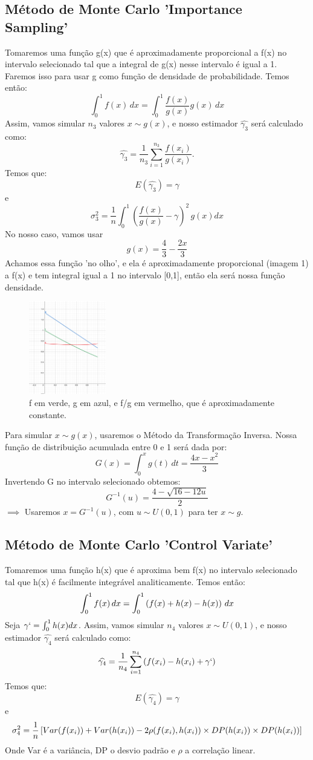 \documentclass{article}
\begin{document}
\subsection{Método de Monte Carlo 'Importance Sampling'}
Tomaremos uma função g(x) que é aproximadamente proporcional a f(x) no intervalo selecionado tal que a integral de g(x) nesse intervalo é igual a 1. Faremos isso para usar g como função de densidade de probabilidade. Temos então:
\[
\int_{0}^{1} f(x) \,dx = \int_{0}^{1} \frac{f(x)}{g(x)}g(x)\,dx 
\]
Assim, vamos simular $n_3$ valores $x \sim g(x)$, e nosso estimador $\widehat{\gamma_3}$ será calculado como:
\[
\widehat{\gamma_3} = \frac{1}{n_3} \sum_{i=1}^{n_3} \frac{f(x_i)}{g(x_i)}.
\]
Temos que:
\[ 
E(\widehat{\gamma_3}) = \gamma
\] 
e
\[
\sigma^2_3 = \frac{1}{n} \int_{0}^{1} (\frac{f(x)}{g(x)} - \gamma)^2 \,g(x)dx
\]
No nosso caso, vamos usar 
\[
g(x) = \frac{4}{3} - \frac{2x}{3}
\]
Achamos essa função 'no olho', e ela é aproximadamente proporcional (imagem 1) a f(x) e tem integral igual a 1 no intervalo [0,1], então ela será nossa função densidade.

\begin{figure}[ht]
\centering
\includegraphics[width=0.3\textwidth]{f_g_fg.png}
\caption{\label{fig:f_g_fg} f em verde, g em azul, e f/g em vermelho, que é aproximadamente constante. }
\end{figure}
\newpage
Para simular $x \sim g(x)$, usaremos o Método da Transformação Inversa. Nossa função de distribuição acumulada entre 0 e 1 será dada por:
\[
G(x) = \int_{0}^{x} g(t) \,dt =  \frac{4x - x^2}{3}
\]
Invertendo G no intervalo selecionado obtemos:
\[
G^{-1}(u) = \frac{4-\sqrt{16-12u}}{2}
\]
$\implies$ Usaremos $x = G^{-1}(u)$, com $u \sim U(0,1)$ para ter $x \sim g$.



\subsection{Método de Monte Carlo 'Control Variate'}
Tomaremos uma função h(x) que é aproxima bem f(x) no intervalo selecionado tal que h(x) é facilmente integrável analiticamente.
Temos então:
\[
\int_{0}^{1} f(x) \,dx = \int_{0}^{1} \left(f(x) + h(x) - h(x)\right)  \,dx 
\]
Seja $\gamma`= \int_{0}^{1} h(x)dx  $. Assim, vamos simular $n_4$ valores $x \sim U(0,1)$, e nosso estimador $\widehat{\gamma_4}$ será calculado como:
\[
\widehat{\gamma_4} = \frac{1}{n_4} \sum_{i=1}^{n_4} \left(f(x_i)-h(x_i)+\gamma`\right) 
\]
Temos que:
\[ 
E(\widehat{\gamma_4}) = \gamma
\] 
e
\[
\sigma^2_4 = \frac{1}{n} \left[Var(f(x_i)) + Var(h(x_i)) -2 \rho (f(x_i), h(x_i)) \times
DP(h(x_i)) \times DP(h(x_i)) \right]
\]
Onde Var é a variância, DP o desvio padrão e $\rho$ a correlação linear.
\end{document}
